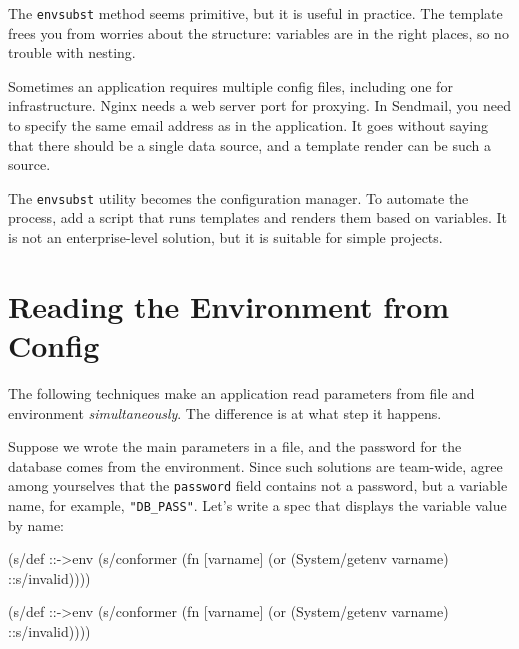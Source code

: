 \fi

The \verb|envsubst| method seems primitive, but it is useful in practice. The template frees you from worries about the structure: variables are in the right places, so no trouble with nesting.

Sometimes an application requires multiple config files, including one for infrastructure. Nginx needs a web server port for proxying. In Sendmail, you need to specify the same email address as in the application. It goes without saying that there should be a single data source, and a template render can be such a source.

The \verb|envsubst| utility becomes the configuration manager. To automate the process, add a script that runs templates and renders them based on variables. It is not an enterprise-level solution, but it is suitable for simple projects.

\section{ Reading the Environment from Config}

The following techniques make an application read parameters from file and environment \emph{simultaneously}. The difference is at what step it happens.

Suppose we wrote the main parameters in a file, and the password for the database comes from the environment. Since such solutions are team-wide, agree among yourselves that the \verb|password| field contains not a password, but a variable name, for example, \verb|"DB_PASS"|. Let's write a spec that displays the variable value by name:

\ifx\DEVICETYPE\MOBILE

\begin{english}
  \begin{clojure}
(s/def ::->env
  (s/conformer
   (fn [varname]
     (or (System/getenv varname)
         ::s/invalid))))
  \end{clojure}
\end{english}

\else

\begin{english}
  \begin{clojure}
(s/def ::->env
  (s/conformer
   (fn [varname]
     (or (System/getenv varname) ::s/invalid))))
  \end{clojure}
\end{english}

\fi

